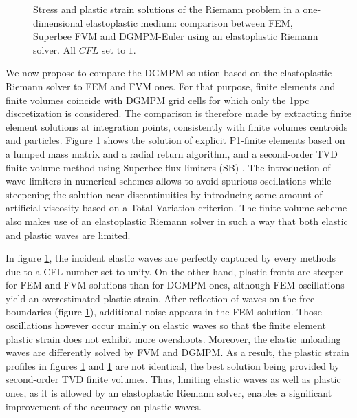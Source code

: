 \begin{figure}[h!]
  \centering
  { \label{subfig:ep_dgmpm_fvm1}}
  { \label{subfig:ep_dgmpm_fvm3}}
  {}
  \caption{Stress and plastic strain solutions of the Riemann problem in a one-dimensional elastoplastic medium: comparison between FEM, Superbee FVM and DGMPM-Euler using an elastoplastic Riemann solver. All $CFL$ set to $1$.}
  \label{fig:RP_EP_dgmpm_fvm}
\end{figure}


We now propose to compare the DGMPM solution based on the elastoplastic Riemann solver to FEM and FVM ones.
For that purpose, finite elements and finite volumes coincide with DGMPM grid cells for which only the 1ppc discretization is considered.
The comparison is therefore made by extracting finite element solutions at integration points, consistently with finite volumes centroids and particles.
Figure \ref{fig:RP_EP_dgmpm_fvm} shows the solution of explicit P1-finite elements based on a lumped mass matrix and a radial return algorithm, and a second-order TVD finite volume method using Superbee flux limiters (SB) \cite{Thomas_EP}.
The introduction of wave limiters in numerical schemes allows to avoid spurious oscillations while steepening the solution near discontinuities by introducing some amount of artificial viscosity based on a Total Variation criterion.
The finite volume scheme also makes use of an elastoplastic Riemann solver in such a way that both elastic and plastic waves are limited.

In figure \ref{fig:RP_EP_dgmpm_fvm}, the incident elastic waves are perfectly captured by every methods due to a CFL number set to unity.
On the other hand, plastic fronts are steeper for FEM and FVM solutions than for DGMPM ones, although FEM oscillations yield an overestimated plastic strain. 
After reflection of waves on the free boundaries (figure \ref{fig:RP_EP_dgmpm_fvm}), additional noise appears in the FEM solution.
Those oscillations however occur mainly on elastic waves so that the finite element plastic strain does not exhibit more overshoots.
Moreover, the elastic unloading waves are differently solved by FVM and DGMPM.
As a result, the plastic strain profiles in figures \ref{fig:RP_EP_dgmpm_fvm} and \ref{fig:RP_EP_dgmpm_fvm} are not identical, the best solution being provided by second-order TVD finite volumes. %
Thus, limiting elastic waves as well as plastic ones, as it is allowed by an elastoplastic Riemann solver, enables a significant improvement of the accuracy on plastic waves.

